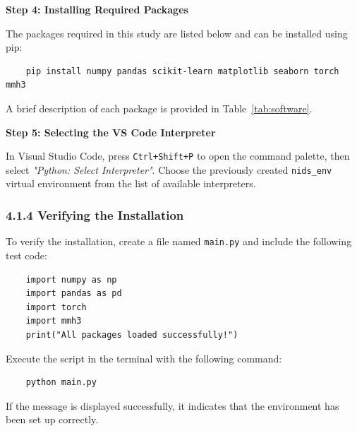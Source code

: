 \begin{ZhChapter}
    \textbf{Step 4: Installing Required Packages}  

    The packages required in this study are listed below and can be installed using pip:
    \begin{verbatim}
    pip install numpy pandas scikit-learn matplotlib seaborn torch mmh3
    \end{verbatim}
    A brief description of each package is provided in Table~\ref{tab:software}.


    \textbf{Step 5: Selecting the VS Code Interpreter}  

    In Visual Studio Code, press \texttt{Ctrl+Shift+P} to open the command palette, then select \textit{"Python: Select Interpreter"}. Choose the previously created \texttt{nids\_env} virtual environment from the list of available interpreters.

    \subsubsection{4.1.4 Verifying the Installation}

    To verify the installation, create a file named \texttt{main.py} and include the following test code:
    \begin{verbatim}
    import numpy as np
    import pandas as pd
    import torch
    import mmh3
    print("All packages loaded successfully!")
    \end{verbatim}

    Execute the script in the terminal with the following command:
    \begin{verbatim}
    python main.py
    \end{verbatim}

    If the message is displayed successfully, it indicates that the environment has been set up correctly.




    

\end{ZhChapter}